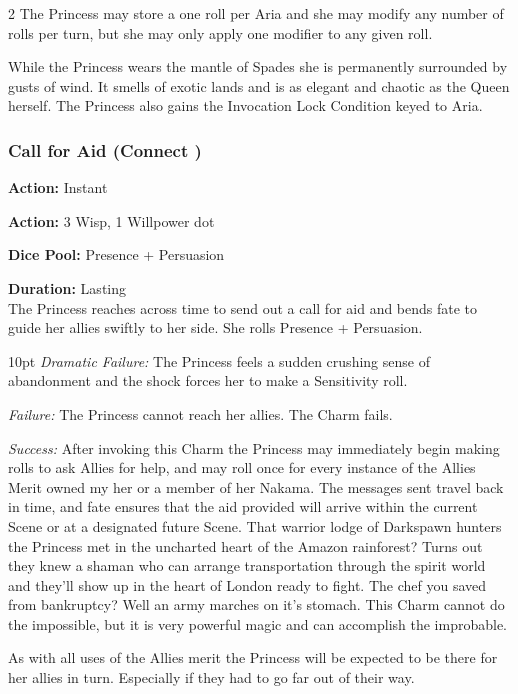 \begin{multicols}{2}
The Princess may store a one roll per Aria and she may modify any number of rolls per turn, but she may only apply one modifier to any given roll. 

While the Princess wears the mantle of Spades she is permanently surrounded by gusts of wind. It smells of exotic lands and is as elegant and chaotic as the Queen herself. The Princess also gains the Invocation Lock Condition keyed to Aria.

\subsubsection*{Call for Aid (Connect \textbullet\textbullet\textbullet\textbullet\textbullet)}

\noindent \textbf{Action:} Instant

\noindent \textbf{Action:} 3 Wisp, 1 Willpower dot

\noindent \textbf{Dice Pool:} Presence + Persuasion

\noindent \textbf{Duration:} Lasting \\

\noindent The Princess reaches across time to send out a call for aid and bends fate to guide her allies swiftly to her side. She rolls Presence + Persuasion.

\begin{myindentpar}{10pt}    \emph{Dramatic Failure:} The Princess feels a sudden crushing sense of abandonment and the shock forces her to make a Sensitivity roll. 

    \emph{Failure:} The Princess cannot reach her allies. The Charm fails.

    \emph{Success:} After invoking this Charm the Princess may immediately begin making rolls to ask Allies for help, and may roll once for every instance of the Allies Merit owned my her or a member of her Nakama. The messages sent travel back in time, and fate ensures that the aid provided will arrive within the current Scene or at a designated future Scene. That warrior lodge of Darkspawn hunters the Princess met in the uncharted heart of the Amazon rainforest? Turns out they knew a shaman who can arrange transportation through the spirit world and they'll show up in the heart of London ready to fight. The chef you saved from bankruptcy? Well an army marches on it's stomach. This Charm cannot do the impossible, but it is very powerful magic and can accomplish the improbable. 
	
	As with all uses of the Allies merit the Princess will be expected to be there for her allies in turn. Especially if they had to go far out of their way. 


\end{myindentpar}
\end{multicols}
